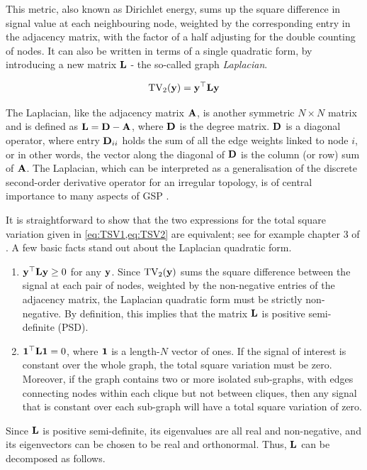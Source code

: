 This metric, also known as Dirichlet energy, sums up the square difference in signal value at each neighbouring node, weighted by the corresponding entry in the adjacency matrix, with the factor of a half adjusting for the double counting of nodes. It can also be written in terms of a single quadratic form, by introducing a new matrix $\mathbf{L}$ - the so-called graph \textit{Laplacian}. 

\begin{equation}
    \label{eq:TSV2}
    \text{TV}_2(\mathbf{y}) = \mathbf{y}^\top \mathbf{L} \mathbf{y}
\end{equation}

The Laplacian, like the adjacency matrix $\mathbf{A}$, is another symmetric $N \times N$ matrix and is defined as $\mathbf{L} = \mathbf{D} - \mathbf{A}$, where $\mathbf{D}$ is the degree matrix. $\mathbf{D}$ is a diagonal operator, where entry $\mathbf{D}_{ii}$ holds the sum of all the edge weights linked to node $i$, or in other words, the vector along the diagonal of $\mathbf{D}$ is the column (or row) sum of $\mathbf{A}$. The Laplacian, which can be interpreted as a generalisation of the discrete second-order derivative operator for an irregular topology, is of central importance to many aspects of GSP \citep{Shuman2013}. 

\newpage

It is straightforward to show that the two expressions for the total square variation given in \cref{eq:TSV1,eq:TSV2} are equivalent; see for example chapter 3 of \cite{Ortega2022}. A few basic facts stand out about the Laplacian quadratic form.

\begin{enumerate}
    \item $\mathbf{y}^\top \mathbf{L} \mathbf{y} \geq 0$ for any $\mathbf{y}$. Since $\text{TV}_2(\mathbf{y})$ sums the square difference between the signal at each pair of nodes, weighted by the non-negative entries of the adjacency matrix, the Laplacian quadratic form must be strictly non-negative. By definition, this implies that the matrix $\mathbf{L}$ is positive semi-definite (PSD). 
    \item $\mathbf{1}^\top \mathbf{L} \mathbf{1} = 0$, where $\mathbf{1}$ is a length-$N$ vector of ones. If the signal of interest is constant over the whole graph, the total square variation must be zero. Moreover, if the graph contains two or more isolated sub-graphs, with edges connecting nodes within each clique but not between cliques, then any signal that is constant over each sub-graph will have a total square variation of zero. 
\end{enumerate}

Since $\mathbf{L}$ is positive semi-definite, its eigenvalues are all real and non-negative, and its eigenvectors can be chosen to be real and orthonormal. Thus, $\mathbf{L}$ can be decomposed as follows. 


